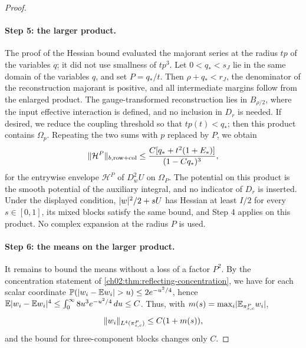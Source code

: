 \begin{proof}
\paragraph{Step 5: the larger product.}
The proof of the Hessian bound evaluated the majorant series at the radius $tp$ of the variables $q$; it did not use smallness of $tp^3$. Let $0<q_*<s_J$ lie in the same domain of the variables $q$, and set $P=q_*/t$. Then $\rho+q_*<r_J$, the denominator of the reconstruction majorant is positive, and all intermediate margins follow from the enlarged product. The gauge-transformed reconstruction lies in $B_{\rho/2}$, where the input effective interaction is defined, and no inclusion in $D_r$ is needed. If desired, we reduce the coupling threshold so that $tp(t)<q_*$; then this product contains $\Omega_p$. Repeating the two sums with $p$ replaced by $P$, we obtain
\[
 \lVert \mathcal H^P\rVert_{b,\mathrm{row+col}}\le\frac{C[q_*+t^2(1+E_*)]}{(1-Cq_*)^3},
\]
for the entrywise envelope $\mathcal H^P$ of $D_w^2U$ on $\Omega_P$. The potential on this product is the smooth potential of the auxiliary integral, and no indicator of $D_r$ is inserted. Under the displayed condition, $\lvert w\rvert^2/2+sU$ has Hessian at least $I/2$ for every $s\in[0,1]$, its mixed blocks satisfy the same bound, and Step 4 applies on this product. No complex expansion at the radius $P$ is used.

\paragraph{Step 6: the means on the larger product.}
It remains to bound the means without a loss of a factor $P^2$. By the concentration statement of \cref{ch02:thm:reflecting-concentration}, we have for each scalar coordinate $\mathbb P(\lvert w_i-\mathbb E w_i\rvert>u)\le2e^{-u^2/4}$, hence $\mathbb E\lvert w_i-\mathbb E w_i\rvert^4\le\int_0^\infty8u^3e^{-u^2/4}\,du\le C$. Thus, with $m(s)=\max_i\lvert \mathbb E_{\pi^P_{s,c}}w_i\rvert$,
\begin{equation}\label{ch10:eq:fourth-moment}
 \lVert w_i\rVert_{L^4(\pi^P_{s,c})}\le C(1+m(s)),
\end{equation}
and the bound for three-component blocks changes only $C$.


\end{proof}
